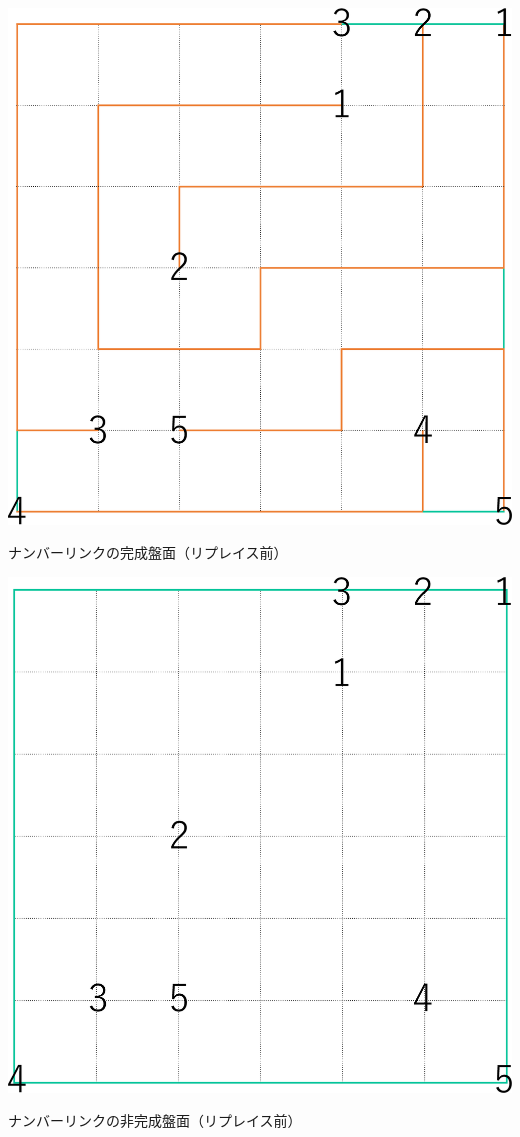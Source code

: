 \begin{clearpagefigure}
  \includegraphics[width=0.85\linewidth,clip]{fig/NumberLink.eps}
  \caption{ナンバーリンクの完成盤面（リプレイス前）}
  \label{figure:NumberLink}
\end{clearpagefigure}

\begin{clearpagefigure}
  \includegraphics[width=0.85\linewidth,clip]{fig/NumberLinkQuestion.eps}
  \caption{ナンバーリンクの非完成盤面（リプレイス前）}
  \label{figure:NumberLinkQuestion}
\end{clearpagefigure}

